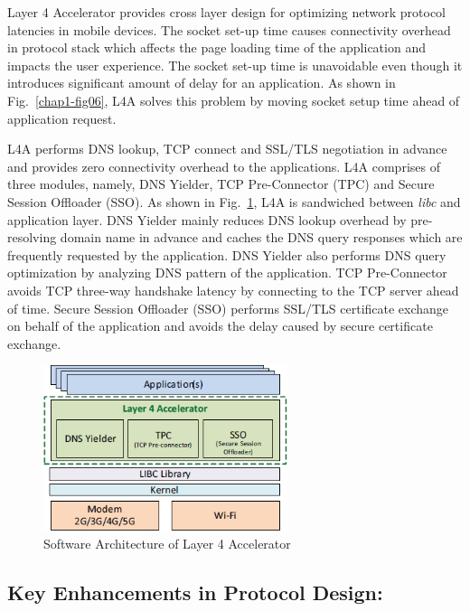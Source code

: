 \begin{multicols}{2}
Layer 4 Accelerator provides cross layer design for optimizing network protocol latencies in mobile devices. The socket set-up time causes connectivity overhead in protocol stack which affects the page loading time of the application and impacts the user experience. The socket set-up time is unavoidable even though it introduces significant amount of delay for an application. As shown in Fig.~\ref{chap1-fig06}, L4A solves this problem by moving socket setup time ahead of application request.

L4A performs DNS lookup, TCP connect and SSL/TLS negotiation in advance and provides zero connectivity overhead to the applications. L4A comprises of three modules, namely, DNS Yielder, TCP Pre-Connector (TPC) and Secure Session Offloader (SSO). As shown in Fig.~\ref{chap1-fig07}, L4A is sandwiched between \textit{libc} and application layer. DNS Yielder mainly reduces DNS lookup overhead by pre-resolving domain name in advance and caches the DNS query responses which are frequently requested by the application. DNS Yielder also performs DNS query optimization by analyzing DNS pattern of the application. TCP Pre-Connector avoids TCP three-way handshake latency by connecting to the TCP server ahead of time. Secure Session Offloader (SSO) performs SSL/TLS certificate exchange on behalf of the application and avoids the delay caused by secure certificate exchange.

\begin{figure}[H]
\centering
\includegraphics[scale=0.75]{src/Figures/chap1/chap1-fig07.jpg}
\caption{Software Architecture of Layer 4 Accelerator}\label{chap1-fig07}
\end{figure}

\subsection{Key Enhancements in Protocol Design:}


\end{multicols}
